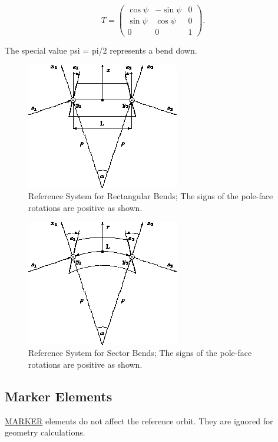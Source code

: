 \[
T =
 \begin{pmatrix}
  \cos \psi &  -\sin \psi & 0 \\
  \sin \psi &  \cos \psi  & 0 \\
  0	    &	0	  & 1 
 \end{pmatrix}
.
\]

The special value psi = pi/2 represents a bend down.  

\begin{figure}[H]
  \centering
	\includegraphics{figures/ref_rbend.png}
  \caption{Reference System for Rectangular Bends; The signs of the pole-face rotations are positive as shown.}
\end{figure}

\begin{figure}[H]
  \centering
	\includegraphics{figures/ref_sbend.png}
  \caption{Reference System for Sector Bends; The signs of the pole-face rotations are positive as shown. }
\end{figure}
\label{local_sbend}


\subsection{Marker Elements}
\href{marker.html}{MARKER} elements do not  affect the reference orbit. 
They are ignored for geometry calculations.  

